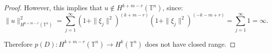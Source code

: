 \documentclass[10pt,a4paper]{amsart}
\begin{document}
\begin{proof}
	However, this implies that $ u \notin H^{k + m - r}(\mathbb{T}^n) $, since:
	\[
	\|u\|_{H^{k + m - r}(\mathbb{T}^n)}^2 = \sum_{j=1}^\infty (1 + \|\xi_j\|^2)^{(k + m - r)} (1 + \|\xi_j\|^2)^{(-k - m + r)} = \sum_{j=1}^\infty 1 = \infty.
	\]
	
	Therefore $ p(D): H^{k + m - r}(\mathbb{T}^n) \to H^k(\mathbb{T}^n) $ does not have closed range.
  \end{proof}
\end{document}
